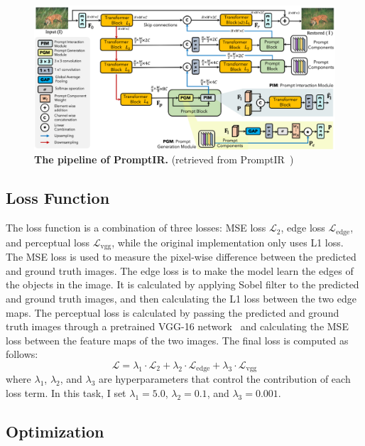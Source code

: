 \documentclass[10pt,twocolumn,letterpaper]{article}
\begin{document}
\begin{figure}[h]
  \centering
  \includegraphics[width=0.95\linewidth]{assets/PromptIR_pipeline.png}
  \caption{\textbf{The pipeline of PromptIR.} (retrieved from
    PromptIR~\cite{PromptIR})}
  \label{fig:pipeline}
\end{figure}

\subsection{Loss Function}

The loss function is a combination of three losses: MSE loss
$\mathcal{L}_{2}$, edge loss $\mathcal{L}_{\text{edge}}$, and
perceptual loss $\mathcal{L}_{\text{vgg}}$, while the original implementation
only uses L1 loss. The MSE loss is used to measure the pixel-wise difference
between the predicted and ground truth images. The edge loss is to make the
model learn the edges of the objects in the image. It is calculated by applying
Sobel filter to the predicted and ground truth images, and then calculating the
L1 loss between the two edge maps. The perceptual loss is calculated by passing
the predicted and ground truth images through a pretrained VGG-16
network~\cite{VGG} and calculating the MSE loss between the feature maps of the
two images. The final loss is computed as follows:
\begin{equation}
  \mathcal{L} = \lambda_1 \cdot \mathcal{L}_{2} + \lambda_2 \cdot \mathcal{L}_{\text{edge}} + \lambda_3 \cdot \mathcal{L}_{\text{vgg}}
\end{equation}
where $\lambda_1$, $\lambda_2$, and $\lambda_3$ are hyperparameters that control
the contribution of each loss term. In this task, I set $\lambda_1 = 5.0$,
$\lambda_2 = 0.1$, and $\lambda_3 = 0.001$.

\subsection{Optimization}
\end{document}
